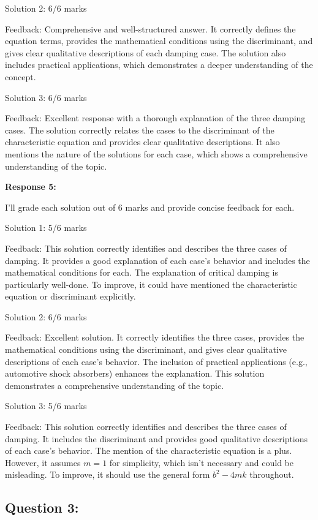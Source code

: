 \documentclass[a4paper,11pt]{article}
\begin{document}
Solution 2: 6/6 marks

Feedback: Comprehensive and well-structured answer. It correctly defines the equation terms, provides the mathematical conditions using the discriminant, and gives clear qualitative descriptions of each damping case. The solution also includes practical applications, which demonstrates a deeper understanding of the concept.

Solution 3: 6/6 marks

Feedback: Excellent response with a thorough explanation of the three damping cases. The solution correctly relates the cases to the discriminant of the characteristic equation and provides clear qualitative descriptions. It also mentions the nature of the solutions for each case, which shows a comprehensive understanding of the topic.

\bigskip
\textbf{Response 5:}

I'll grade each solution out of 6 marks and provide concise feedback for each.

Solution 1: 5/6 marks

Feedback: This solution correctly identifies and describes the three cases of damping. It provides a good explanation of each case's behavior and includes the mathematical conditions for each. The explanation of critical damping is particularly well-done. To improve, it could have mentioned the characteristic equation or discriminant explicitly.

Solution 2: 6/6 marks

Feedback: Excellent solution. It correctly identifies the three cases, provides the mathematical conditions using the discriminant, and gives clear qualitative descriptions of each case's behavior. The inclusion of practical applications (e.g., automotive shock absorbers) enhances the explanation. This solution demonstrates a comprehensive understanding of the topic.

Solution 3: 5/6 marks

Feedback: This solution correctly identifies and describes the three cases of damping. It includes the discriminant and provides good qualitative descriptions of each case's behavior. The mention of the characteristic equation is a plus. However, it assumes \(m=1\) for simplicity, which isn't necessary and could be misleading. To improve, it should use the general form \(b^2 - 4mk\) throughout.

\subsection*{Question 3:}
\end{document}

